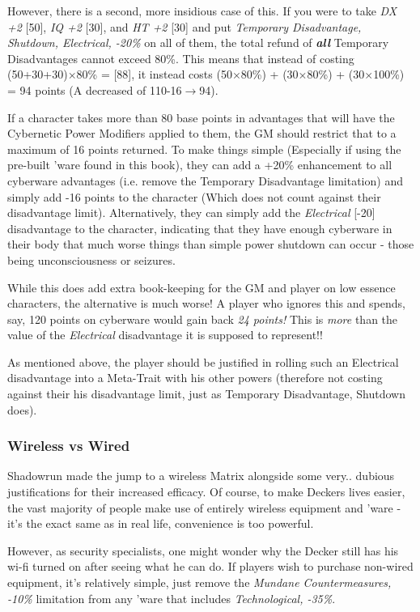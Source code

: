 \begin{multicols*}{3}
	However, there is a second, more insidious case of this. If you were to take \textit{DX +2} [50], \textit{IQ +2} [30], and \textit{HT +2} [30] and put \textit{Temporary Disadvantage, Shutdown, Electrical, -20\%} on all of them, the total refund of \textbf{\textit{all}} Temporary Disadvantages cannot exceed 80\%. This means that instead of costing (50+30+30)$\times$80\% = [88], it instead costs (50$\times$80\%) + (30$\times$80\%) + (30$\times$100\%) = 94 points (A decreased of 110-16$\rightarrow$94).
	
	If a character takes more than 80 base points in advantages that will have the Cybernetic Power Modifiers applied to them, the GM should restrict that to a maximum of 16 points returned. To make things simple (Especially if using the pre-built 'ware found in this book), they can add a +20\% enhancement to all cyberware advantages (i.e. remove the Temporary Disadvantage limitation) and simply add -16 points to the character (Which does not count against their disadvantage limit). Alternatively, they can simply add the \textit{Electrical} [-20] disadvantage to the character, indicating that they have enough cyberware in their body that much worse things than simple power shutdown can occur - those being unconsciousness or seizures.
	
	While this does add extra book-keeping for the GM and player on low essence characters, the alternative is much worse! A player who ignores this and spends, say, 120 points on cyberware would gain back \textit{24 points!} This is \textit{more} than the value of the \textit{Electrical} disadvantage it is supposed to represent!!
	
	As mentioned above, the player should be justified in rolling such an Electrical disadvantage into a Meta-Trait with his other powers (therefore not costing against their his disadvantage limit, just as Temporary Disadvantage, Shutdown does).
	
	\subsubsection{Wireless vs Wired}
	
	Shadowrun made the jump to a wireless Matrix alongside some very.. dubious justifications for their increased efficacy. Of course, to make Deckers lives easier, the vast majority of people make use of entirely wireless equipment and 'ware - it's the exact same as in real life, convenience is too powerful. 
	
	However, as security specialists, one might wonder why the Decker still has his wi-fi turned on after seeing what he can do. If players wish to purchase non-wired equipment, it's relatively simple, just remove the \textit{Mundane Countermeasures, -10\%} limitation from any 'ware that includes \textit{Technological, -35\%}. 
	

\end{multicols*}
